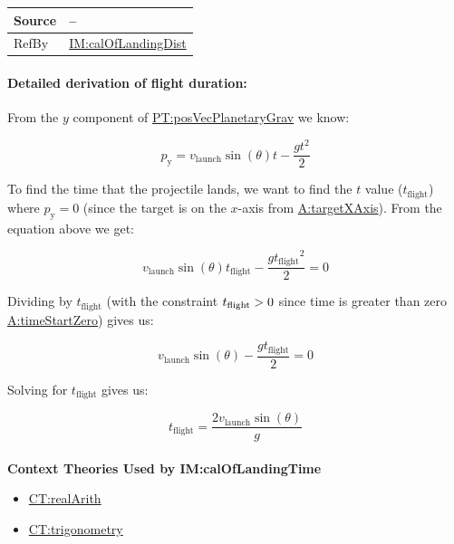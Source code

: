 \documentclass[12pt]{article}
\newcommand{\gt}{\ensuremath >}
\begin{document}
\begin{minipage}{\textwidth}
\begin{tabular}{>{\raggedright}p{}>{\raggedright\arraybackslash}p{}}
\\ \midrule
Source & --
         
\\ \midrule
RefBy & \hyperref[IM:calOfLandingDist]{IM:calOfLandingDist}
        
\\ \bottomrule
\end{tabular}
\end{minipage}

\paragraph{Detailed derivation of flight duration:}
\label{IM:calOfLandingTimeDeriv}

From the $y$ component of \hyperref[PT:posVecPlanetaryGrav]{PT:posVecPlanetaryGrav} we know:

\begin{displaymath}
p_\text{y} = v_\text{launch} \sin (\theta) t - \frac{g t^2}{2}
\end{displaymath}

To find the time that the projectile lands, we want to find the $t$ value
(${t_{\text{flight}}}$) where ${p_{\text{y}}}=0$ (since the target is on the
$x$-axis from \hyperref[targetXAxis]{A:targetXAxis}). From the equation above we
get:

\begin{displaymath}
{{v_{\text{launch}}}} \sin (\theta) {t_{\text{flight}}}-\frac{g {t_{\text{flight}}}^{2}}{2}=0
\end{displaymath}

Dividing by ${t_{\text{flight}}}$ (with the constraint ${t_{\text{flight}}}\gt{}0$ since time is greater than zero \hyperref[timeStartZero]{A:timeStartZero}) gives us:

\begin{displaymath}
{{v_{\text{launch}}}} \sin (\theta) - \frac{g {t_{\text{flight}}}}{2}=0
\end{displaymath}

Solving for ${t_{\text{flight}}}$ gives us:

\begin{displaymath}
{t_{\text{flight}}}=\frac{2 {v_{\text{launch}}} \sin\left(θ\right)}{g}
\end{displaymath}
~\\

\noindent \textbf{Context Theories Used by IM:calOfLandingTime}

\begin{itemize}
\item \hyperref[CT:realArith]{CT:realArith}
\item \hyperref[CT:trigonometry]{CT:trigonometry}
\end{itemize}
\end{document}
